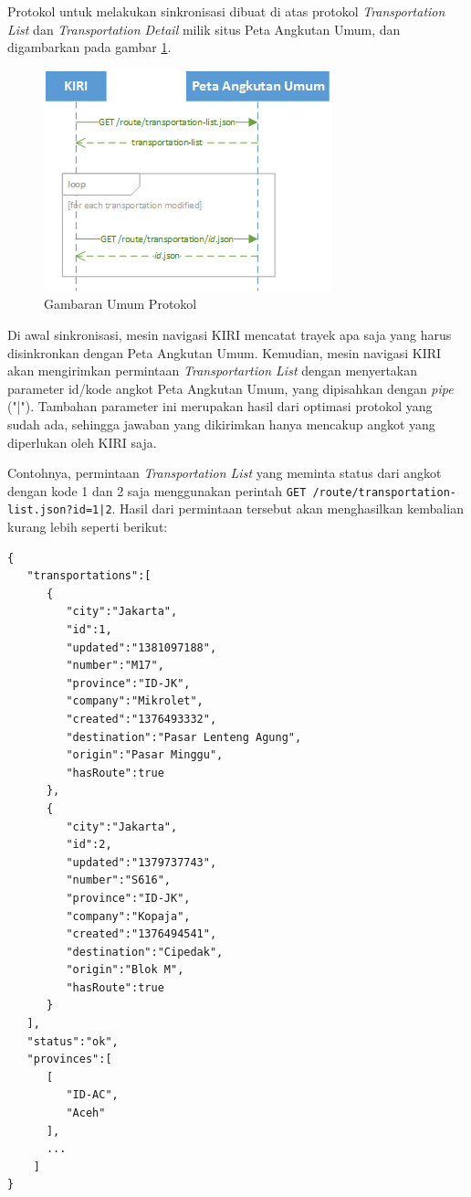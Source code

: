 Protokol untuk melakukan sinkronisasi dibuat di atas protokol \textit{Transportation List} dan \textit{Transportation Detail} milik situs Peta Angkutan Umum, dan digambarkan pada gambar \ref{fig:4_gambaran_umum_protokol}.

\begin{figure}
	\centering
	\includegraphics[scale=1.0]{Gambar/4_gambaran_umum_protokol}
	\caption{Gambaran Umum Protokol} 
	\label{fig:4_gambaran_umum_protokol}
\end{figure}

 Di awal sinkronisasi, mesin navigasi KIRI mencatat trayek apa saja yang harus disinkronkan dengan Peta Angkutan Umum. Kemudian, mesin navigasi KIRI akan mengirimkan permintaan \textit{Transportartion List} dengan menyertakan parameter id/kode angkot Peta Angkutan Umum, yang dipisahkan dengan \textit{pipe} ("|"). Tambahan parameter ini merupakan hasil dari optimasi protokol yang sudah ada, sehingga jawaban yang dikirimkan hanya mencakup angkot yang diperlukan oleh KIRI saja.

Contohnya, permintaan \textit{Transportation List} yang meminta status dari angkot dengan kode 1 dan 2 saja menggunakan perintah \texttt{GET /route/transportation-list.json?id=1|2}. Hasil dari permintaan tersebut akan menghasilkan kembalian kurang lebih seperti berikut:

\begin{lstlisting}
{
   "transportations":[
      {
         "city":"Jakarta",
         "id":1,
         "updated":"1381097188",
         "number":"M17",
         "province":"ID-JK",
         "company":"Mikrolet",
         "created":"1376493332",
         "destination":"Pasar Lenteng Agung",
         "origin":"Pasar Minggu",
         "hasRoute":true
      },
      {
         "city":"Jakarta",
         "id":2,
         "updated":"1379737743",
         "number":"S616",
         "province":"ID-JK",
         "company":"Kopaja",
         "created":"1376494541",
         "destination":"Cipedak",
         "origin":"Blok M",
         "hasRoute":true
      }
   ],
   "status":"ok",
   "provinces":[
      [
         "ID-AC",
         "Aceh"
      ],
      ...
    ]
}
\end{lstlisting}

